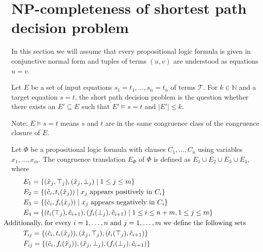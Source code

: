 \section*{NP-completeness of shortest path decision problem}

In this section we will assume that every propositional logic formula is given in conjunctive normal form and tuples of terms $(u,v)$ are understood as equations $u = v$.

\begin{definition}

Let $E$ be a set of input equations $s_1 = t_1,\ldots,s_n = t_n$ of terms $\mathcal{T}$.
For $k \in \mathbb{N}$ and a target equation $s = t$, the short path decision problem is the question whether there exists an $E' \subseteq E$ such that $E' \models s = t$ and $|E'| \leq k$.

\end{definition}

Note: $E \models s = t$ means $s$ and $t$ are in the same congruence class of the congruence closure of $E$.

\begin{definition}

Let $\Phi$ be a propositional logic formula with clauses $C_1,\ldots,C_n$ using variables $x_1,\ldots,x_m$.
The congruence translation $E_{\Phi}$ of $\Phi$ is defined as $E_1 \cup E_2 \cup E_3 \cup E_4$, where
\begin{align*}
	&E_1 = \{ (\hat{x}_j,\top_j), (\hat{x}_j,\bot_j) \mid 1 \leq j \leq m\} \\
	&E_2 = \{ (\hat{c}_i, t_i(\hat{x}_j)) \mid x_j \text{ appears positively in } C_i\} \\
	&E_3 = \{ (\hat{c}_i, f_i(\hat{x}_j)) \mid x_j \text{ appears negatively in } C_i\} \\
	&E_4 = \{ (t_i(\top_j),\hat{c}_{i+1}),(f_i(\bot_j), \hat{c}_{i+1}) \mid 1 \leq i \leq n+m, 1 \leq j \leq m\} \\
&\hspace{-1cm}\text{Additionally, for every $i = 1,\ldots, n$ and $j = 1,\ldots, m$ we define the following sets }\\
&T_{ij} = \{(\hat{c}_i, t_i(\hat{x}_j)), (\hat{x}_j,\top_j), (t_i(\top_j),\hat{c}_{i+1})\} \\
&F_{ij} = \{(\hat{c}_i, f_i(\hat{x}_j)), (\hat{x}_j,\bot_j), (f_i(\bot_j),\hat{c}_{i+1})\}
\end{align*}

\end{definition}

